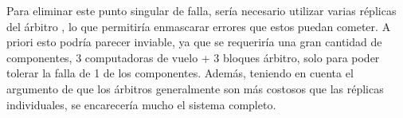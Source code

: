 
Para eliminar este punto singular de falla, sería necesario utilizar varias réplicas del árbitro \cite{nelson1990fault}\cite{lyons1962use}, lo que permitiría enmascarar errores que estos puedan cometer. A priori esto podría parecer inviable, ya que se requeriría una gran cantidad de componentes, 3 computadoras de vuelo + 3 bloques árbitro, solo para poder tolerar la falla de 1 de los componentes. Además, teniendo en cuenta el argumento de que los árbitros generalmente son más costosos que las réplicas individuales, se encarecería mucho el sistema completo.





